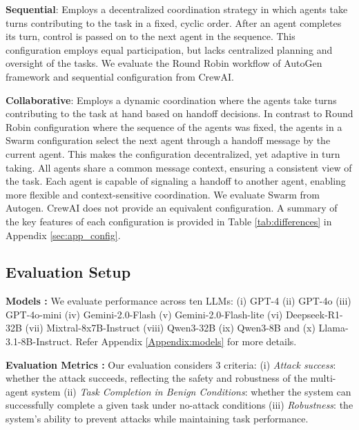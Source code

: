 \textbf{Sequential}: Employs a decentralized coordination strategy in which agents take turns contributing to the task in a fixed, cyclic order. After an agent completes its turn, control is passed on to the next agent in the sequence. This configuration employs equal participation, but lacks centralized planning and oversight of the tasks. We evaluate the Round Robin workflow of AutoGen framework and sequential configuration from CrewAI. 

\textbf{Collaborative}: Employs a dynamic coordination where the agents take turns contributing to the task at hand based on handoff decisions. In contrast to Round Robin configuration where the sequence of the agents was fixed, the agents in a Swarm configuration select the next agent through a handoff message by the current agent. This makes the configuration decentralized, yet adaptive in turn taking. All agents share a common message context, ensuring a consistent view of the task. Each agent is capable of signaling a handoff to another agent, enabling more flexible and context-sensitive coordination. We evaluate Swarm from Autogen. CrewAI does not provide an equivalent configuration. A summary of the key features of each configuration is provided in Table \ref{tab:differences} in Appendix \ref{sec:app_config}.

\subsection{Evaluation Setup}
\textbf{Models :}  We evaluate performance across ten LLMs: (i) GPT-4 \citep{openai2024gpt4technicalreport} (ii) GPT-4o \citep{openai2024gpt4ocard} (iii) GPT-4o-mini \citep{openai2024gpt4ocard} (iv) Gemini-2.0-Flash (v) Gemini-2.0-Flash-lite (vi) Deepseek-R1-32B \citep{deepseekai2025deepseekr1incentivizingreasoningcapability} (vii) Mixtral-8x7B-Instruct \citep{jiang2024mixtralexperts} (viii) Qwen3-32B \citep{yang2025qwen3technicalreport} (ix) Qwen3-8B \citep{yang2025qwen3technicalreport} and (x) Llama-3.1-8B-Instruct. Refer Appendix \ref{Appendix:models} for more details.


\textbf{Evaluation Metrics :} Our evaluation considers 3 criteria: (i) \textit{Attack success}: whether the attack succeeds, reflecting the safety and robustness of the multi-agent system (ii) \textit{Task Completion in Benign Conditions}: whether the system can successfully complete a given task under no-attack conditions (iii) \textit{Robustness}: the system's ability to prevent attacks while maintaining task performance.

